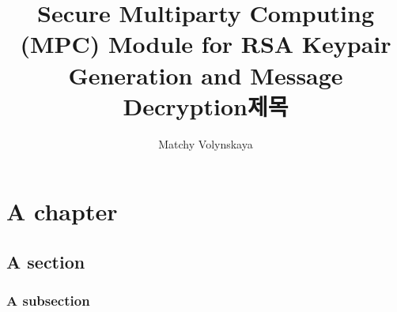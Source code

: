 \documentclass[11pt]{report}
\title{Secure Multiparty Computing (MPC) Module for RSA Keypair Generation and Message Decryption}
\title*{제목}
\author{Matchy Volynskaya}
\begin{document}


\pagebreak



\pagebreak

\tableofcontents

\pagebreak

\chapter{A chapter}

\section{A section}

\subsection{A subsection}

\pagebreak


\end{document}
